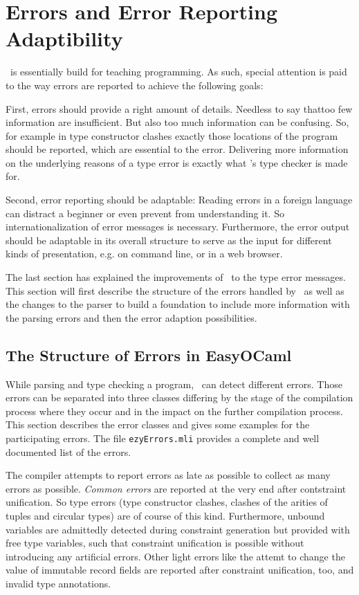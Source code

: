 
\section{Errors and Error Reporting Adaptibility}
\label{sec:errors}

\easyocaml\ is essentially build for teaching programming.
As such, special attention is paid to the way errors are reported to achieve
the following goals:

First, errors should provide a right amount of details. Needless to say thattoo
few information are insufficient. But also too much information can be
confusing. So, for example in type constructor clashes exactly those locations
of the program should be reported, which are essential to the error.
Delivering more information on the underlying reasons of a type error is
exactly what \easyocaml's type checker is made for.

Second, error reporting should be adaptable: Reading errors in a foreign
language can distract a beginner or even prevent from understanding it.
So internationalization of error messages is necessary.
Furthermore, the error output should be adaptable in its overall structure to
serve as the input for different kinds of presentation, e.g. 
on command line, or in a web browser.

The last section has explained the improvements of \easyocaml\ to the type
error messages. This section will first describe the structure  of the errors
handled by
\easyocaml\ as well as the changes to the parser to build a foundation to
include more information with the parsing errors and then the error
adaption possibilities.

\subsection{The Structure of Errors in EasyOCaml}
\label{sec:easyerrors}

While parsing and type checking a program, \easyocaml\ can detect different errors.
Those errors can be separated into three classes differing by the stage of the
compilation process where they occur and in the impact on the further
compilation process.
This section describes the error classes and gives some examples for the
participating errors.  The file \texttt{ezyErrors.mli} provides a complete and
well documented list of the errors.

The compiler attempts to report errors as late as possible to collect as many
errors as possible. \emph{Common errors} are reported at the very end after
contstraint unification. So type errors (type constructor clashes, clashes of
the arities of tuples and circular types) are of course of this kind.
Furthermore, unbound variables are admittedly detected during constraint
generation but provided with free type variables, such that constraint
unification is possible without introducing any artificial errors.
Other light errors like the attemt to change the value of immutable record
fields are reported after constraint unification, too, and invalid type
annotations.

